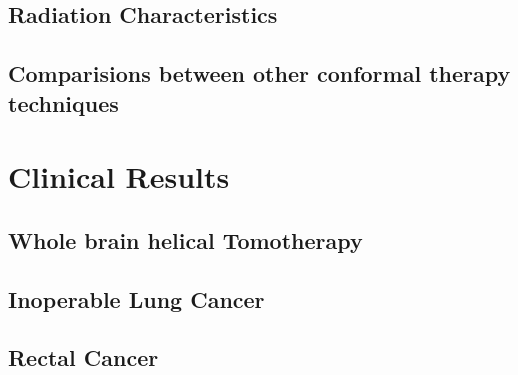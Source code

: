 \documentclass[12pt,journal,compsoc]{IEEEtran} %
\begin{document}
  \subsection{Radiation Characteristics}
  \subsection{Comparisions between other conformal therapy techniques}
  \section{Clinical Results}
  \subsection{Whole brain helical Tomotherapy}
  \subsection{Inoperable Lung Cancer}
  \subsection{Rectal Cancer}
  
  {}
  
  
\end{document}
